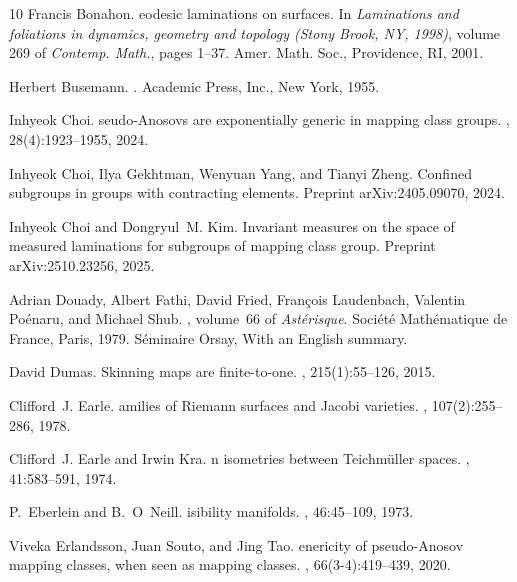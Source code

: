 \documentclass[dvipdfmx]{amsart}
\theoremstyle{remark}
\begin{document}
\begin{thebibliography}{10}
Francis Bonahon.
eodesic laminations on surfaces.
\newblock In {\em Laminations and foliations in dynamics, geometry and topology (Stony Brook, NY, 1998)}, volume 269 of {\em Contemp. Math.}, pages 1--37. Amer. Math. Soc., Providence, RI, 2001.

Herbert Busemann.
.
\newblock Academic Press, Inc., New York, 1955.

Inhyeok Choi.
seudo-{A}nosovs are exponentially generic in mapping class groups.
, 28(4):1923--1955, 2024.

Inhyeok Choi, Ilya Gekhtman, Wenyuan Yang, and Tianyi Zheng.
\newblock Confined subgroups in groups with contracting elements.
\newblock Preprint arXiv:2405.09070, 2024.

Inhyeok Choi and Dongryul~M. Kim.
\newblock Invariant measures on the space of measured laminations for subgroups of mapping class group.
\newblock Preprint arXiv:2510.23256, 2025.

Adrian Douady, Albert Fathi, David Fried, Fran{\c{c}}ois Laudenbach, Valentin Po{\'e}naru, and Michael Shub.
, volume~66 of {\em Ast\'erisque}.
\newblock Soci\'et\'e Math\'ematique de France, Paris, 1979.
\newblock S\'eminaire Orsay, With an English summary.

David Dumas.
\newblock Skinning maps are finite-to-one.
, 215(1):55--126, 2015.

Clifford~J. Earle.
amilies of {R}iemann surfaces and {J}acobi varieties.
, 107(2):255--286, 1978.

Clifford~J. Earle and Irwin Kra.
n isometries between {T}eichm{\"u}ller spaces.
, 41:583--591, 1974.

P.~Eberlein and B.~O\textquotesingle~Neill.
isibility manifolds.
, 46:45--109, 1973.

Viveka Erlandsson, Juan Souto, and Jing Tao.
enericity of pseudo-{A}nosov mapping classes, when seen as mapping classes.
, 66(3-4):419--439, 2020.


\end{thebibliography}
\end{document}
